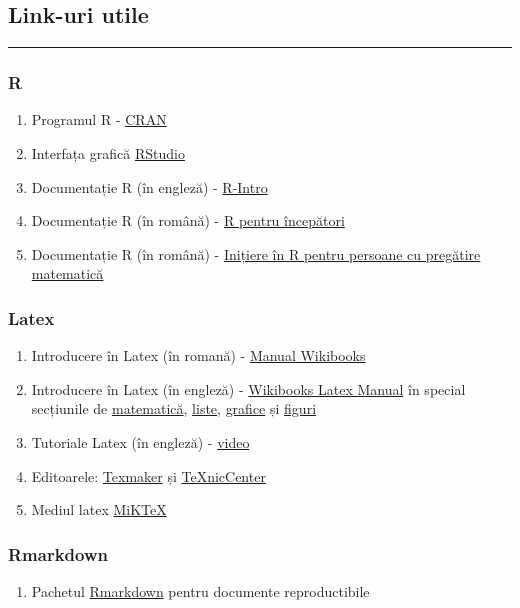 \documentclass[]{article}
\providecommand{\tightlist}{%
  \setlength{\itemsep}{0pt}\setlength{\parskip}{0pt}}
\begin{document}
\subsection{Link-uri utile}\label{link-uri-utile}

\begin{center}\rule{0.5\linewidth}{\linethickness}\end{center}

\subsubsection{R}\label{r}

\begin{enumerate}
\def\labelenumi{\arabic{enumi}.}
\tightlist
\item
  Programul R - \href{https://cran.r-project.org/}{CRAN}
\item
  Interfața grafică \href{https://www.rstudio.com/}{RStudio}
\item
  Documentație R (în engleză) -
  \href{https://cran.r-project.org/doc/manuals/r-release/R-intro.pdf}{R-Intro}
\item
  Documentație R (în română) -
  \href{ftp://cran.r-project.org/pub/R/doc/contrib/Paradis-rdebuts_RO.pdf}{R
  pentru începători}
\item
  Documentație R (în română) -
  \href{http://www.edumanager.ro/community/documente/initiere_in_r.pdf}{Inițiere
  în R pentru persoane cu pregătire matematică}
\end{enumerate}

\subsubsection{Latex}\label{latex}

\begin{enumerate}
\def\labelenumi{\arabic{enumi}.}
\tightlist
\item
  Introducere în Latex (în romană) -
  \href{https://ro.wikibooks.org/wiki/LaTeX_(carte)}{Manual Wikibooks}
\item
  Introducere în Latex (în engleză) -
  \href{https://en.wikibooks.org/wiki/LaTeX}{Wikibooks Latex Manual} în
  special secțiunile de
  \href{https://en.wikibooks.org/wiki/LaTeX/Mathematics}{matematică},
  \href{https://en.wikibooks.org/wiki/LaTeX/List_Structures}{liste},
  \href{https://en.wikibooks.org/wiki/LaTeX/Importing_Graphics}{grafice}
  și
  \href{https://en.wikibooks.org/wiki/LaTeX/Floats,_Figures_and_Captions}{figuri}
\item
  Tutoriale Latex (în engleză) -
  \href{https://www.youtube.com/playlist?list=PLDD406480D35CE390}{video}
\item
  Editoarele:
  \href{http://www.xm1math.net/texmaker/download.html}{Texmaker} și
  \href{http://www.texniccenter.org/}{TeXnicCenter}
\item
  Mediul latex \href{https://miktex.org/}{MiKTeX}
\end{enumerate}

\subsubsection{Rmarkdown}\label{rmarkdown}

\begin{enumerate}
\def\labelenumi{\arabic{enumi}.}
\tightlist
\item
  Pachetul \href{http://rmarkdown.rstudio.com/index.html}{Rmarkdown}
  pentru documente reproductibile
\end{enumerate}
\end{document}
